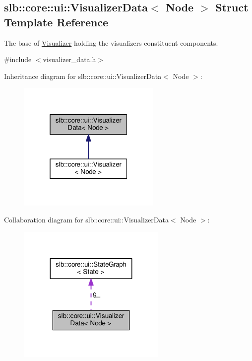 \hypertarget{structslb_1_1core_1_1ui_1_1VisualizerData}{}\subsection{slb\+:\+:core\+:\+:ui\+:\+:Visualizer\+Data$<$ Node $>$ Struct Template Reference}
\label{structslb_1_1core_1_1ui_1_1VisualizerData}


The base of \hyperlink{structslb_1_1core_1_1ui_1_1Visualizer}{Visualizer} holding the visualizer\textquotesingle{}s constituent components.  




{\ttfamily \#include $<$visualizer\+\_\+data.\+h$>$}



Inheritance diagram for slb\+:\+:core\+:\+:ui\+:\+:Visualizer\+Data$<$ Node $>$\+:\nopagebreak
\begin{figure}[H]
\begin{center}
\leavevmode
\includegraphics[width=196pt]{structslb_1_1core_1_1ui_1_1VisualizerData__inherit__graph}
\end{center}
\end{figure}


Collaboration diagram for slb\+:\+:core\+:\+:ui\+:\+:Visualizer\+Data$<$ Node $>$\+:\nopagebreak
\begin{figure}[H]
\begin{center}
\leavevmode
\includegraphics[width=203pt]{structslb_1_1core_1_1ui_1_1VisualizerData__coll__graph}
\end{center}
\end{figure}
